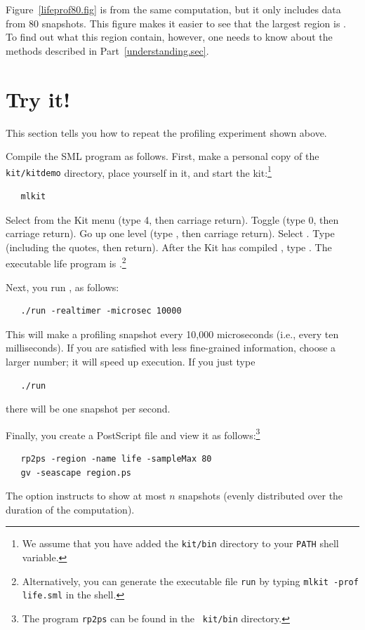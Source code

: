 \documentclass[12pt]{book}
\begin{document}
Figure~\ref{lifeprof80.fig} is from the same computation, but it only
includes data from 80 snapshots. This figure makes it easier to see
that the largest region is . To find out what this
region contain, however, one needs to know about the methods described
in Part~\ref{understanding.sec}.

\section{Try it!}
This section tells you how to repeat the profiling experiment shown
above.

Compile the SML program  as follows. First,
make a personal copy of the {\tt kit/kitdemo} directory, place
yourself in it, and start the kit:\footnote{We assume that you have added
  the {\tt kit/bin} directory to your {\tt PATH} shell variable.}
\begin{verbatim}
   mlkit
\end{verbatim}
Select  from the Kit menu (type 4, then carriage
return).  Toggle  (type 0, then carriage
return). Go up one level (type , then carriage return).
Select .  Type 
(including the quotes, then return). After the Kit has compiled
, type . The executable life program is
.\footnote{Alternatively, you can generate the
  executable file {\tt run} by typing {\tt mlkit -prof life.sml} in
  the shell.}

Next, you run , as follows:
\begin{verbatim}
   ./run -realtimer -microsec 10000
\end{verbatim}
This will make a profiling snapshot every 10,000 microseconds (i.e.,
every ten milliseconds). If you are satisfied with less fine-grained
information, choose a larger number; it will speed up execution. If
you just type
\begin{verbatim}
   ./run 
\end{verbatim}
there will be one snapshot per second.

Finally, you create a PostScript file and view it as
follows:\footnote{The program {\tt rp2ps} can be found in the {\tt
    kit/bin} directory.}
%
\begin{verbatim}
   rp2ps -region -name life -sampleMax 80 
   gv -seascape region.ps
\end{verbatim}
The option  instructs  to show at
most $n$ snapshots (evenly distributed over the duration of the
computation).
\end{document}
